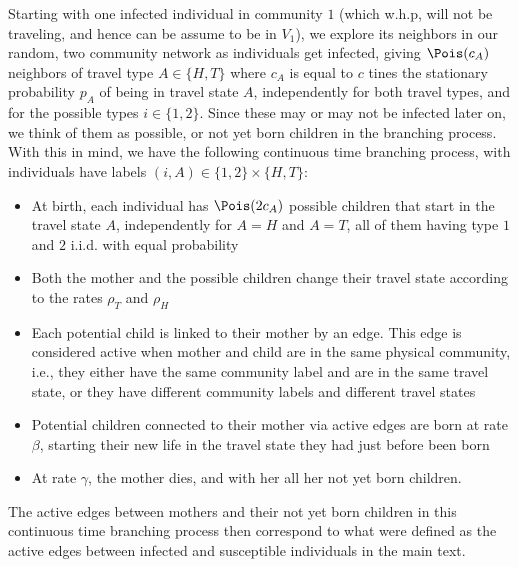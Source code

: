 \documentclass[11pt]{article}
\begin{document}
Starting with one infected individual in community $1$ (which w.h.p, will not be traveling, and hence can be assume to be in $V_1$), we explore its neighbors in our random, two community network as individuals get infected, giving $\Pois(c_A)$ neighbors of travel type $A\in\{H,T\}$ where $c_A$ is equal to $c$ tines the stationary probability $p_A$ of being in travel state $A$, independently for both travel types, and for the possible types $i\in\{1,2\}$.  Since these may or may not be infected later on, we think of them as possible, or not yet {\color{blue} born} children in the branching process.  With this in mind, we have the following continuous time branching process, with 
individuals have labels $(i,A)\in \{1,2\}\times \{H,T\}$:
    \begin{itemize}
        \item At birth, each individual has $\Pois(2c_A)$ possible children that start in the travel state $A$, independently for $A=H$ and $A=T$, all of them having type $1$ and $2$ i.i.d. with equal probability
        \item Both the mother and the possible children change their travel state according to the rates $\rho_T$ and $\rho_H$
        \item {Each potential child is linked to their mother by an edge.  This edge is considered active when mother and  child are in the same physical community, i.e., they either have the same community label and are in the same travel state, or they have different community labels and different travel states}
        \item {Potential children connected to their mother via active edges are born at rate $\beta$, starting their new life in the travel state they had just before been born}
        \item At rate $\gamma$, the mother dies, and with her all her not yet born children.
    \end{itemize}
{The active edges between mothers and their not yet born children in this continuous time branching process then correspond to what were defined as the active edges 
between infected and susceptible individuals in the main text. }
\end{document}

